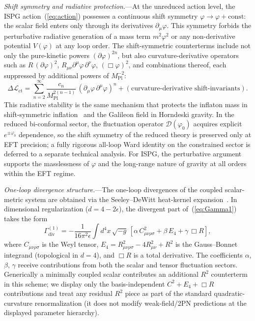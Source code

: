 \documentclass[aps,prd,onecolumn,superscriptaddress,nofootinbib,showpacs,12pt,notitlepage]{revtex4-2}
\newcommand{\Mpl}{M_{\mathrm{Pl}}}
\begin{document}
\textit{Shift symmetry and radiative protection.}---At the
unreduced action level, the ISPG action~(\ref{eq:action})
possesses a continuous shift symmetry
$\varphi \to \varphi + \mathrm{const}$: the scalar field
enters only through its derivatives $\partial_\mu\varphi$.
This symmetry forbids the perturbative radiative generation of a mass
term $m^2\varphi^2$ or any non-derivative potential
$V(\varphi)$ at any loop order. The shift-symmetric
counterterms include not only the pure-kinetic powers
$(\partial\varphi)^{2n}$, but also curvature-derivative
operators such as $R\,(\partial\varphi)^2$,
$R_{\mu\nu}\partial^\mu\varphi\,\partial^\nu\varphi$,
$(\Box\varphi)^2$, and combinations thereof, each suppressed
by additional powers of $\Mpl^{-2}$:
\begin{equation}\label{eq:shift_protected}
  \Delta\mathcal{L}_{\mathrm{ct}}
  = \sum_{n=2}^{\infty}
    \frac{c_n}{\Mpl^{2(n-1)}}\,
    (\partial_\mu\varphi\,\partial^\mu\varphi)^n
    + (\text{curvature-derivative shift-invariants}).
\end{equation}
This radiative stability is the same mechanism that
protects the inflaton mass in shift-symmetric
inflation~\cite{Cheung2008} and the Galileon field in
Horndeski gravity.  In the reduced bi-conformal sector,
the fluctuation operator $\mathcal{D}(\varphi_0)$ acquires
explicit $e^{\pm\varphi_0}$ dependence, so the shift symmetry
of the reduced theory is preserved only at EFT precision; a
fully rigorous all-loop Ward identity on the constrained
sector is deferred to a separate technical analysis. For ISPG,
the perturbative argument supports the masslessness of $\varphi$
and the long-range nature of gravity at all orders within
the EFT regime.

\textit{One-loop divergence structure.}---The one-loop
divergences of the coupled scalar-metric system are
obtained via the Seeley--DeWitt heat-kernel
expansion~\cite{tHooftVeltman1974,DeWitt1967}.  In
dimensional regularization ($d = 4 - 2\epsilon$), the
divergent part of~(\ref{eq:Gamma1}) takes the form
\begin{equation}\label{eq:div_structure}
  \Gamma^{(1)}_{\mathrm{div}}
  = -\frac{1}{16\pi^2\epsilon}\int d^4x\,\sqrt{-g}\,
    \left[\alpha\,C_{\mu\nu\rho\sigma}^2
    + \beta\,E_4
    + \gamma\,\Box R\right],
\end{equation}
where $C_{\mu\nu\rho\sigma}$ is the Weyl tensor,
$E_4 = R_{\mu\nu\rho\sigma}^2 - 4R_{\mu\nu}^2 + R^2$ is
the Gauss--Bonnet integrand (topological in $d = 4$), and
$\Box R$ is a total derivative.  The coefficients
$\alpha$, $\beta$, $\gamma$ receive contributions from both
the scalar and tensor fluctuation sectors. Generically a
minimally coupled scalar contributes an additional $R^2$
counterterm in this scheme; we display only the
basis-independent $C^2 + E_4 + \Box R$ contributions and
treat any residual $R^2$ piece as part of the standard
quadratic-curvature renormalization (it does not modify
weak-field/2PN predictions at the displayed parameter
hierarchy).
\end{document}
